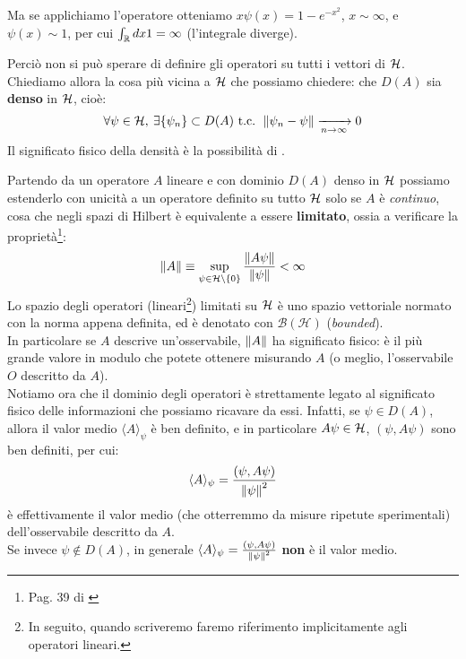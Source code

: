 \documentclass[FisicaTeorica.tex]{subfiles}
\begin{document}
\begin{enumerate}
\begin{es}
	Ma se applichiamo l'operatore otteniamo $x\psi \left(x\right)=1-e^{-x^2}$, $x\sim \infty$, e $\psi \left(x\right)\sim 1$, per cui $\int_{\mathbb{R}} dx 1=\infty$ (l'integrale diverge).
	\end{es}
	Perciò non si può sperare di definire gli operatori su tutti i vettori di $\mathcal{H}$.\\
	Chiediamo allora la cosa più vicina a $\mathcal{H}$ che possiamo chiedere: che $D\left(A\right)$ sia \textbf{denso} in $\mathcal{H}$, cioè:
	\[
	\forall \psi \in \mathcal{H},\> \exists \{\psi_n\} \subset D(A) \text{ t.c. } \left\lVert\psi_n -\psi\right\rVert \xrightarrow[n\to\infty]{} 0
	\]
	Il significato fisico della densità è la possibilità di .\\
\end{enumerate}
Partendo da un operatore $A$ lineare e con dominio $D(A)$ denso in $\mathcal{H}$ possiamo estenderlo con unicità a un operatore definito su tutto $\mathcal{H}$ solo se $A$ è \textit{continuo}, cosa che negli spazi di Hilbert è equivalente a essere \textbf{limitato}, ossia a verificare la proprietà\footnote{Pag. 39 di \cite{spazi_hilbert}}:
	\[
	\left\lVert A\right\rVert \equiv \sup_{\psi \in \mathcal{H} \setminus \{0\}} \frac{\left\lVert A\psi\right\rVert}{\left\lVert\psi\right\rVert} < \infty
	\]
	Lo spazio degli operatori (lineari\footnote{In seguito, quando scriveremo  faremo riferimento implicitamente agli operatori lineari.}) limitati su $\mathcal{H}$ è uno spazio vettoriale normato con la norma appena definita, ed è denotato con $\mathcal{B}\left(\mathcal{H}\right)$ (\textit{bounded}).\\
	In particolare se $A$ descrive un'osservabile, $\left\lVert A\right\rVert$ ha significato fisico: è il più grande valore in modulo che potete ottenere misurando $A$ (o meglio, l'osservabile $O$ descritto da $A$).\\
	Notiamo ora che il dominio degli operatori è strettamente legato al significato fisico delle informazioni che possiamo ricavare da essi.
	Infatti, se $\psi \in D(A)$, allora il valor medio $\langle A\rangle_\psi$ è ben definito, e in particolare $A\psi\in \mathcal{H}$, $(\psi, A\psi)$ sono ben definiti, per cui: 
	\[
	\langle A \rangle_\psi = \frac{(\psi,A\psi)}{\left\lVert\psi\right\rVert^2}
	\]
	è effettivamente il valor medio (che otterremmo da misure ripetute sperimentali) dell'osservabile descritto da $A$.\\
	Se invece $\psi \notin D(A)$, in generale $\langle A\rangle_\psi = \frac{(\psi, A\psi)}{\left\lVert\psi\right\rVert^2}$ \textbf{non} è il valor medio.\\
\end{document}
